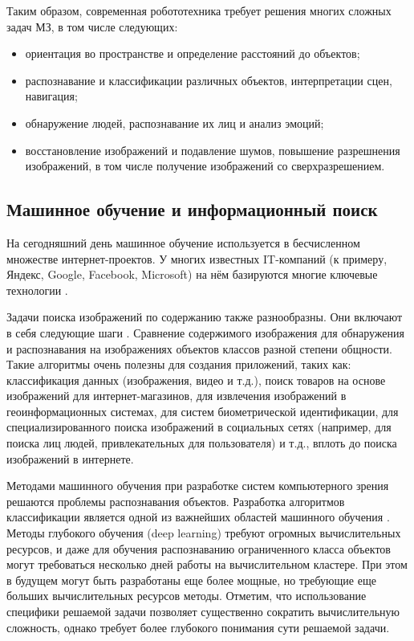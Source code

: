 Таким образом, современная робототехника требует решения многих сложных задач МЗ, в том числе следующих:
\begin{itemize}
	\item ориентация во пространстве и определение расстояний до объектов;
	\item распознавание и классификации различных объектов, интерпретации сцен, навигация;
	\item обнаружение людей, распознавание их лиц и анализ эмоций;
	\item восстановление изображений и подавление шумов, повышение разрешнения изображений, в том числе получение изображений со сверхразрешением.
\end{itemize}

\subsection{Машинное обучение и информационный поиск}


На сегодняшний день машинное обучение используется в бесчисленном множестве интернет-проектов. У многих известных IT-компаний (к примеру, Яндекс, Google, Facebook, Microsoft) на нём базируются многие ключевые технологии \cite{Cormier2016}.

Задачи поиска изображений по содержанию также разнообразны. Они включают в себя следующие шаги \cite{Meer2000}. Сравнение содержимого изображения для обнаружения и распознавания на изображениях объектов классов разной степени общности. Такие алгоритмы очень полезны для создания приложений, таких как: классификация данных (изображения, видео и т.д.), поиск товаров на основе изображений для интернет-магазинов, для извлечения изображений в геоинформационных системах, для систем биометрической идентификации, для специализированного поиска изображений в социальных сетях (например, для поиска лиц людей, привлекательных для пользователя) \cite{Findface} и т.д., вплоть до поиска изображений в интернете.

Методами машинного обучения при разработке систем компьютерного зрения решаются проблемы распознавания объектов. Разработка алгоритмов классификации является одной из важнейших областей машинного обучения \cite{Murino2000}. Методы глубокого обучения (deep learning) требуют огромных вычислительных ресурсов, и даже для обучения распознаванию ограниченного класса объектов могут требоваться несколько дней работы на вычислительном кластере. При этом в будущем могут быть разработаны еще более мощные, но требующие еще больших вычислительных ресурсов методы.  Отметим, что использование специфики решаемой задачи позволяет существенно сократить вычислительную сложность, однако требует более глубокого понимания сути решаемой задачи.

